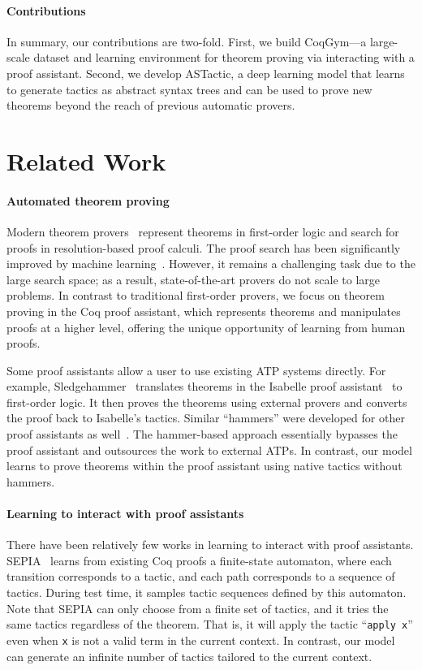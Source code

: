 \documentclass{article}
\newcommand{\smallsec}[1]{\vspace{-3mm} \paragraph{#1}}
\newcommand{\datasetname}{CoqGym}
\begin{document}
\smallsec{Contributions}
In summary, our contributions are two-fold. First, we build \datasetname---a large-scale dataset and learning environment for theorem proving via interacting with a proof assistant. Second, we develop ASTactic, a deep learning model that learns to generate tactics as abstract syntax trees and can be used to prove new theorems beyond the reach of previous automatic provers. 



\section{Related Work}
\vspace{1mm}

\smallsec{Automated theorem proving} Modern theorem provers~\citep{kovacs2013first,schulz2013system} represent theorems in first-order logic and search for proofs in resolution-based proof calculi.
The proof search has been significantly improved by machine learning~\citep{irving2016deepmath,wang2017premise,urban2011malecop,bridge2014machine,loos2017deep,kaliszyk2018reinforcement,rocktaschel2017end}.
However, it remains a challenging task due to the large search space; 
as a result, state-of-the-art provers do not scale to large problems.
In contrast to traditional first-order provers, we focus on theorem proving in the Coq proof assistant, which represents theorems and manipulates proofs at a higher level, offering the unique opportunity of learning from human proofs.

Some proof assistants allow a user to use existing ATP systems directly. For example, Sledgehammer~\citep{paulson2010three} translates theorems in the Isabelle proof assistant~\citep{paulson1994isabelle} to first-order logic.
It then proves the theorems using external provers and converts the proof back to Isabelle's tactics.
Similar ``hammers'' were developed for other proof assistants as well~\citep{kaliszyk2014learning, urban2004mptp, czajka2018hammer}.
The hammer-based approach essentially bypasses the proof assistant and outsources the work to external ATPs. 
In contrast, our model learns to prove theorems within the proof assistant using native tactics without hammers. 



\smallsec{Learning to interact with proof assistants} There have been relatively few works in learning to interact with proof assistants. SEPIA~\citep{gransden2015sepia} learns from existing Coq proofs a finite-state automaton, where each transition corresponds to a tactic, and each path corresponds to a sequence of tactics. During test time, it samples tactic sequences defined by this automaton. Note that SEPIA can only choose from a finite set of tactics, and it tries the same tactics regardless of the theorem. That is, it will apply the tactic ``\texttt{apply x}'' even when \texttt{x} is not a valid term in the current context. In contrast, our model can generate an infinite number of tactics tailored to the current context. 
\end{document}
